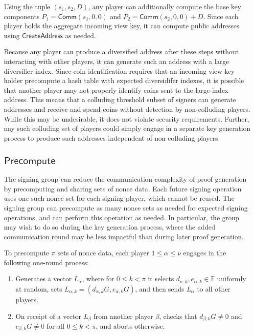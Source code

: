 \documentclass{llncs}
\newcommand{\F}{\mathbb{F}}
\newcommand{\func}[1]{\mathsf{#1}}
\newcommand{\comm}{\func{Comm}}
\begin{document}
Using the tuple $(s_1,s_2,D)$, any player can additionally compute the base key components $P_1 = \comm(s_1,0,0)$ and $P_2 = \comm(s_2,0,0) + D$.
Since each player holds the aggregate incoming view key, it can compute public addresses using $\func{CreateAddress}$ as needed.

\begin{remark}
Because any player can produce a diversified address after these steps without interacting with other players, it can generate such an address with a large diversifier index.
Since coin identification requires that an incoming view key holder precompute a hash table with expected diversidifer indexes, it is possible that another player may not properly identify coins sent to the large-index address.
This means that a colluding threshold subset of signers can generate addresses and receive and spend coins without detection by non-colluding players.
While this may be undesirable, it does not violate security requirements.
Further, any such colluding set of players could simply engage in a separate key generation process to produce such addresses independent of non-colluding players.
\end{remark}


\subsection{\texorpdfstring{$\func{Precompute}$}{Precompute}}

The signing group can reduce the communication complexity of proof generation by precomputing and sharing sets of nonce data.
Each future signing operation uses one such nonce set for each signing player, which cannot be reused.
The signing group can precompute as many nonce sets as needed for expected signing operations, and can perform this operation as needed.
In particular, the group may wish to do so during the key generation process, where the added communication round may be less impactful than during later proof generation.

To precompute $\pi$ sets of nonce data, each player $1 \leq \alpha \leq \nu$ engages in the following one-round process:
\begin{enumerate}
    \item Generates a vector $L_\alpha$, where for $0 \leq k < \pi$ it selects $d_{\alpha,k},e_{\alpha,k} \in \F$ uniformly at random, sets $L_{\alpha,k} = (d_{\alpha,k}G,e_{\alpha,k}G)$, and then sends $L_\alpha$ to all other players.
    \item On receipt of a vector $L_\beta$ from another player $\beta$, checks that $d_{\beta,k}G \neq 0$ and $e_{\beta,k}G \neq 0$ for all $0 \leq k < \pi$, and aborts otherwise.
\end{enumerate}
\end{document}
